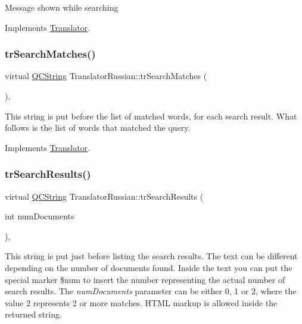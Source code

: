 Message shown while searching 

Implements \mbox{\hyperlink{class_translator}{Translator}}.

\mbox{\label{class_translator_russian_a5649035c3fd9efc3c2237785c061d1af}} 
\subsubsection{\texorpdfstring{trSearchMatches()}{trSearchMatches()}}
{\footnotesize\ttfamily virtual \mbox{\hyperlink{class_q_c_string}{Q\+C\+String}} Translator\+Russian\+::tr\+Search\+Matches (\begin{DoxyParamCaption}{ }\end{DoxyParamCaption})\hspace{0.3cm}{\ttfamily [inline]}, {\ttfamily [virtual]}}

This string is put before the list of matched words, for each search result. What follows is the list of words that matched the query. 

Implements \mbox{\hyperlink{class_translator}{Translator}}.

\mbox{\label{class_translator_russian_a92840ba7a259d367412fa7e0ce0f8705}} 
\subsubsection{\texorpdfstring{trSearchResults()}{trSearchResults()}}
{\footnotesize\ttfamily virtual \mbox{\hyperlink{class_q_c_string}{Q\+C\+String}} Translator\+Russian\+::tr\+Search\+Results (\begin{DoxyParamCaption}\item[{int}]{num\+Documents }\end{DoxyParamCaption})\hspace{0.3cm}{\ttfamily [inline]}, {\ttfamily [virtual]}}

This string is put just before listing the search results. The text can be different depending on the number of documents found. Inside the text you can put the special marker \$num to insert the number representing the actual number of search results. The {\itshape num\+Documents} parameter can be either 0, 1 or 2, where the value 2 represents 2 or more matches. H\+T\+ML markup is allowed inside the returned string. 

